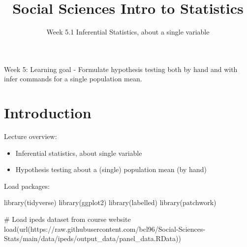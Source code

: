 \documentclass[
  letterpaper,
  DIV=11,
  numbers=noendperiod]{scrartcl}
\title{Social Sciences Intro to Statistics}
\subtitle{Week 5.1 Inferential Statistics, about a single variable}
\author{}
\date{}
\newenvironment{Shaded}{\begin{snugshade}}{\end{snugshade}}
\newcommand{\CommentTok}[1]{\textcolor[rgb]{0.37,0.37,0.37}{#1}}
\newcommand{\FunctionTok}[1]{\textcolor[rgb]{0.28,0.35,0.67}{#1}}
\newcommand{\NormalTok}[1]{\textcolor[rgb]{0.00,0.23,0.31}{#1}}
\newcommand{\StringTok}[1]{\textcolor[rgb]{0.13,0.47,0.30}{#1}}
\begin{document}
\maketitle

Week 5: Learning goal - Formulate hypothesis testing both by hand and
with infer commands for a single population mean.

\section{Introduction}\label{introduction}

Lecture overview:

\begin{itemize}
\item
  Inferential statistics, about single variable
\item
  Hypothesis testing about a (single) population mean (by hand)
\end{itemize}

Load packages:

\begin{Shaded}
\begin{Highlighting}[]
\FunctionTok{library}\NormalTok{(tidyverse)}
\FunctionTok{library}\NormalTok{(ggplot2)}
\FunctionTok{library}\NormalTok{(labelled)}
\FunctionTok{library}\NormalTok{(patchwork)}

\CommentTok{\# Load ipeds dataset from course website}
\FunctionTok{load}\NormalTok{(}\FunctionTok{url}\NormalTok{(}\StringTok{\textquotesingle{}https://raw.githubusercontent.com/bcl96/Social{-}Sciences{-}Stats/main/data/ipeds/output\_data/panel\_data.RData\textquotesingle{}}\NormalTok{))}
\end{Highlighting}
\end{Shaded}
\end{document}
